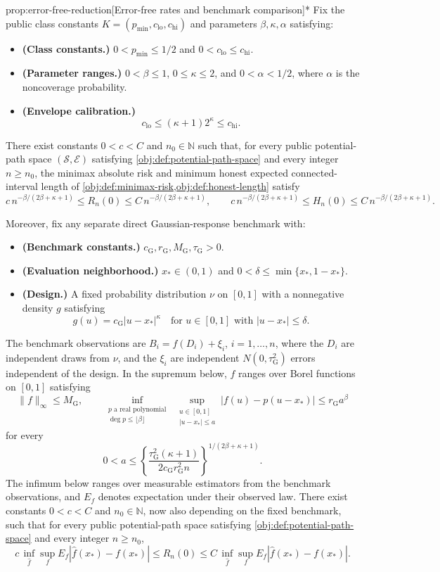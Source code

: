 \begin{propositionv}{prop:error-free-reduction}[Error-free rates and benchmark comparison]*
Fix the public class constants \(K=(p_{\min},c_{\mathrm{lo}},c_{\mathrm{hi}})\) and parameters \(\beta,\kappa,\alpha\) satisfying:
\begin{itemize}
\item \textbf{(Class constants.)} \(0<p_{\min}\le 1/2\) and \(0<c_{\mathrm{lo}}\le c_{\mathrm{hi}}\).
\item \textbf{(Parameter ranges.)} \(0<\beta\le1\), \(0\le\kappa\le2\), and \(0<\alpha<1/2\), where \(\alpha\) is the noncoverage probability.
\item \textbf{(Envelope calibration.)}
\[
c_{\mathrm{lo}}\le(\kappa+1)2^\kappa\le c_{\mathrm{hi}}.
\]
\end{itemize}
There exist constants \(0<c<C\) and \(n_0\in\mathbb N\) such that, for every public potential-path space \((\mathcal S,\mathcal E)\) satisfying \cref{obj:def:potential-path-space} and every integer \(n\ge n_0\), the minimax absolute risk and minimum honest expected connected-interval length of \cref{obj:def:minimax-risk,obj:def:honest-length} satisfy
\[
c\,n^{-\beta/(2\beta+\kappa+1)}
\le R_n(0)\le
C\,n^{-\beta/(2\beta+\kappa+1)},
\qquad
c\,n^{-\beta/(2\beta+\kappa+1)}
\le H_n(0)\le
C\,n^{-\beta/(2\beta+\kappa+1)}.
\]

Moreover, fix any separate direct Gaussian-response benchmark with:
\begin{itemize}
\item \textbf{(Benchmark constants.)} \(c_{\mathrm G},r_{\mathrm G},M_{\mathrm G},\tau_{\mathrm G}>0\).
\item \textbf{(Evaluation neighborhood.)} \(x_*\in(0,1)\) and \(0<\delta\le\min\{x_*,1-x_*\}\).
\item \textbf{(Design.)} A fixed probability distribution \(\nu\) on \([0,1]\) with a nonnegative density \(g\) satisfying
\[
g(u)=c_{\mathrm G}|u-x_*|^\kappa
\quad\text{for }u\in[0,1]\text{ with }|u-x_*|\le\delta.
\]
\end{itemize}
The benchmark observations are \(B_i=f(D_i)+\xi_i\), \(i=1,\ldots,n\), where the \(D_i\) are independent draws from \(\nu\), and the \(\xi_i\) are independent \(N(0,\tau_{\mathrm G}^2)\) errors independent of the design. In the supremum below, \(f\) ranges over Borel functions on \([0,1]\) satisfying
\[
\|f\|_\infty\le M_{\mathrm G},
\qquad
\inf_{\substack{p\text{ a real polynomial}\\ \deg p\le\lfloor\beta\rfloor}}
\ \sup_{\substack{u\in[0,1]\\ |u-x_*|\le a}}
|f(u)-p(u-x_*)|
\le r_{\mathrm G}a^\beta
\]
for every
\[
0<a\le
\left\{\frac{\tau_{\mathrm G}^2(\kappa+1)}
{2c_{\mathrm G}r_{\mathrm G}^2n}\right\}^{1/(2\beta+\kappa+1)}.
\]
The infimum below ranges over measurable estimators from the benchmark observations, and \(E_f\) denotes expectation under their observed law. There exist constants \(0<c<C\) and \(n_0\in\mathbb N\), now also depending on the fixed benchmark, such that for every public potential-path space satisfying \cref{obj:def:potential-path-space} and every integer \(n\ge n_0\),
\[
c\,\inf_{\widehat f}\sup_f E_f|\widehat f(x_*)-f(x_*)|
\le R_n(0)\le
C\,\inf_{\widehat f}\sup_f E_f|\widehat f(x_*)-f(x_*)|.
\]
\end{propositionv}
